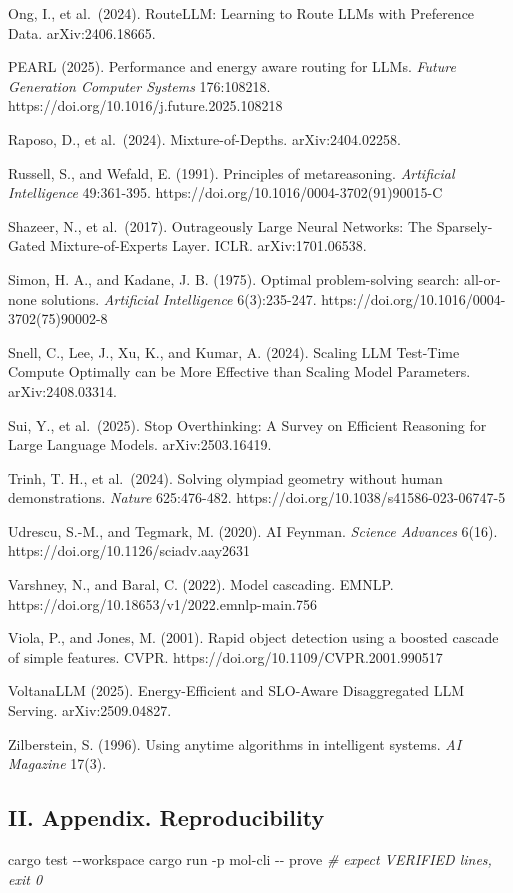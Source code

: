 \documentclass[
  10pt,
]{article}
\newenvironment{Shaded}{}{}
\newcommand{\AttributeTok}[1]{\textcolor[rgb]{0.49,0.56,0.16}{#1}}
\newcommand{\CommentTok}[1]{\textcolor[rgb]{0.38,0.63,0.69}{\textit{#1}}}
\newcommand{\ExtensionTok}[1]{#1}
\newcommand{\NormalTok}[1]{#1}
\newcounter{none} %
\begin{document}
Ong, I., et al.~(2024). RouteLLM: Learning to Route LLMs with Preference
Data. arXiv:2406.18665.

PEARL (2025). Performance and energy aware routing for LLMs.
\emph{Future Generation Computer Systems} 176:108218.
https://doi.org/10.1016/j.future.2025.108218

Raposo, D., et al.~(2024). Mixture-of-Depths. arXiv:2404.02258.

Russell, S., and Wefald, E. (1991). Principles of metareasoning.
\emph{Artificial Intelligence} 49:361-395.
https://doi.org/10.1016/0004-3702(91)90015-C

Shazeer, N., et al.~(2017). Outrageously Large Neural Networks: The
Sparsely-Gated Mixture-of-Experts Layer. ICLR. arXiv:1701.06538.

Simon, H. A., and Kadane, J. B. (1975). Optimal problem-solving search:
all-or-none solutions. \emph{Artificial Intelligence} 6(3):235-247.
https://doi.org/10.1016/0004-3702(75)90002-8

Snell, C., Lee, J., Xu, K., and Kumar, A. (2024). Scaling LLM Test-Time
Compute Optimally can be More Effective than Scaling Model Parameters.
arXiv:2408.03314.

Sui, Y., et al.~(2025). Stop Overthinking: A Survey on Efficient
Reasoning for Large Language Models. arXiv:2503.16419.

Trinh, T. H., et al.~(2024). Solving olympiad geometry without human
demonstrations. \emph{Nature} 625:476-482.
https://doi.org/10.1038/s41586-023-06747-5

Udrescu, S.-M., and Tegmark, M. (2020). AI Feynman. \emph{Science
Advances} 6(16). https://doi.org/10.1126/sciadv.aay2631

Varshney, N., and Baral, C. (2022). Model cascading. EMNLP.
https://doi.org/10.18653/v1/2022.emnlp-main.756

Viola, P., and Jones, M. (2001). Rapid object detection using a boosted
cascade of simple features. CVPR.
https://doi.org/10.1109/CVPR.2001.990517

VoltanaLLM (2025). Energy-Efficient and SLO-Aware Disaggregated LLM
Serving. arXiv:2509.04827.

Zilberstein, S. (1996). Using anytime algorithms in intelligent systems.
\emph{AI Magazine} 17(3).

\subsection{II. Appendix.
Reproducibility}\label{ii.-appendix.-reproducibility}

\begin{Shaded}
\begin{Highlighting}[]
\ExtensionTok{cargo}\NormalTok{ test }\AttributeTok{{-}{-}workspace}
\ExtensionTok{cargo}\NormalTok{ run }\AttributeTok{{-}p}\NormalTok{ mol{-}cli }\AttributeTok{{-}{-}}\NormalTok{ prove   }\CommentTok{\# expect VERIFIED lines, exit 0}
\end{Highlighting}
\end{Shaded}
\end{document}
